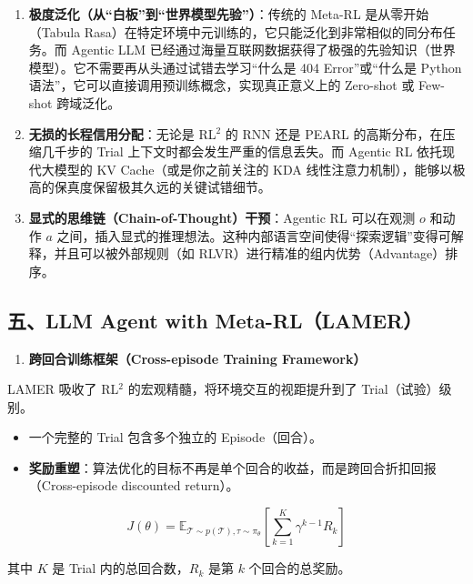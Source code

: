 \begin{enumerate}
\def\labelenumi{\arabic{enumi}.}
\tightlist
\item
  \textbf{极度泛化（从``白板''到``世界模型先验''）}：传统的 Meta-RL 是从零开始（Tabula Rasa）在特定环境中元训练的，它只能泛化到非常相似的同分布任务。而 Agentic LLM 已经通过海量互联网数据获得了极强的先验知识（世界模型）。它不需要再从头通过试错去学习``什么是 404 Error''或``什么是 Python 语法''，它可以直接调用预训练概念，实现真正意义上的 Zero-shot 或 Few-shot 跨域泛化。
\item
  \textbf{无损的长程信用分配}：无论是 RL\(^2\) 的 RNN 还是 PEARL 的高斯分布，在压缩几千步的 Trial 上下文时都会发生严重的信息丢失。而 Agentic RL 依托现代大模型的 KV Cache（或是你之前关注的 KDA 线性注意力机制），能够以极高的保真度保留极其久远的关键试错细节。
\item
  \textbf{显式的思维链（Chain-of-Thought）干预}：Agentic RL 可以在观测 \(o\) 和动作 \(a\) 之间，插入显式的推理想法。这种内部语言空间使得``探索逻辑''变得可解释，并且可以被外部规则（如 RLVR）进行精准的组内优势（Advantage）排序。
\end{enumerate}

\hypertarget{ux4e94llm-agent-with-meta-rllamer}{%
\subsection{五、LLM Agent with Meta-RL（LAMER）}\label{ux4e94llm-agent-with-meta-rllamer}}

\begin{enumerate}
\def\labelenumi{\arabic{enumi}.}
\tightlist
\item
  \textbf{跨回合训练框架（Cross-episode Training Framework）}
\end{enumerate}

LAMER 吸收了 RL\(^2\) 的宏观精髓，将环境交互的视距提升到了 Trial（试验）级别。

\begin{itemize}
\tightlist
\item
  一个完整的 Trial 包含多个独立的 Episode（回合）。
\item
  \textbf{奖励重塑}：算法优化的目标不再是单个回合的收益，而是跨回合折扣回报（Cross-episode discounted return）。
\end{itemize}

\[
J(\theta)=
\mathbb{E}_{\mathcal{T}\sim p(\mathcal{T}),\tau\sim\pi_{\theta}}
\left[
\sum_{k=1}^{K}\gamma^{k-1}R_k
\right]
\]

其中 \(K\) 是 Trial 内的总回合数，\(R_k\) 是第 \(k\) 个回合的总奖励。

